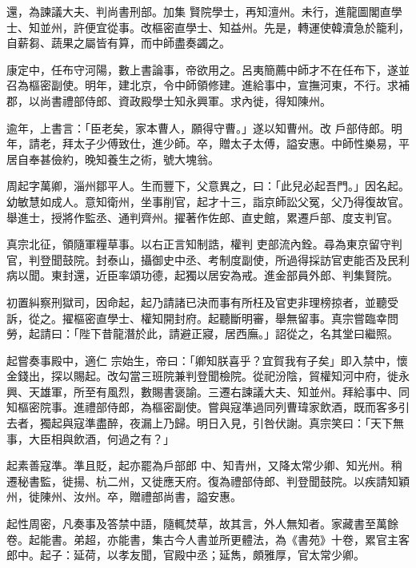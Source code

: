 \begin{pinyinscope}
 還，為諫議大夫、判尚書刑部。加集
 賢院學士，再知澶州。未行，進龍圖閣直學士、知並州，許便宜從事。改樞密直學士、知益州。先是，轉運使韓瀆急於籠利，自薪芻、蔬果之屬皆有算，而中師盡奏蠲之。



 康定中，任布守河陽，數上書論事，帝欲用之。呂夷簡薦中師才不在任布下，遂並召為樞密副使。明年，建北京，令中師領修建。進給事中，宣撫河東，不行。求補郡，以尚書禮部侍郎、資政殿學士知永興軍。求內徙，得知陳州。



 逾年，上書言：「臣老矣，家本曹人，願得守曹。」遂以知曹州。改
 戶部侍郎。明年，請老，拜太子少傅致仕，進少師。卒，贈太子太傅，謚安惠。中師性樂易，平居自奉甚儉約，晚知養生之術，號大塊翁。



 周起字萬卿，淄州鄒平人。生而豐下，父意異之，曰：「此兒必起吾門。」因名起。幼敏慧如成人。意知衛州，坐事削官，起才十三，詣京師訟父冤，父乃得復故官。舉進士，授將作監丞、通判齊州。擢著作佐郎、直史館，累遷戶部、度支判官。



 真宗北征，領隨軍糧草事。以右正言知制誥，權判
 吏部流內銓。尋為東京留守判官，判登聞鼓院。封泰山，攝御史中丞、考制度副使，所過得採訪官吏能否及民利病以聞。東封還，近臣率頌功德，起獨以居安為戒。進金部員外郎、判集賢院。



 初置糾察刑獄司，因命起，起乃請諸已決而事有所枉及官吏非理榜掠者，並聽受訴，從之。擢樞密直學士、權知開封府。起聽斷明審，舉無留事。真宗嘗臨幸問勞，起請曰：「陛下昔龍潛於此，請避正寢，居西廡。」詔從之，名其堂曰繼照。



 起嘗奏事殿中，適仁
 宗始生，帝曰：「卿知朕喜乎？宜賀我有子矣」即入禁中，懷金錢出，探以賜起。改勾當三班院兼判登聞檢院。從祀汾陰，貿權知河中府，徙永興、天雄軍，所至有風烈，數賜書褒諭。三遷右諫議大夫、知並州。拜給事中、同知樞密院事。進禮部侍郎，為樞密副使。嘗與寇準過同列曹瑋家飲酒，既而客多引去者，獨起與寇準盡醉，夜漏上乃歸。明日入見，引咎伏謝。真宗笑曰：「天下無事，大臣相與飲酒，何過之有？」



 起素善寇準。準且貶，起亦罷為戶部郎
 中、知青州，又降太常少卿、知光州。稍遷秘書監，徙揚、杭二州，又徙應天府。復為禮部侍郎、判登聞鼓院。以疾請知穎州，徙陳州、汝州。卒，贈禮部尚書，謚安惠。



 起性周密，凡奏事及答禁中語，隨輒焚草，故其言，外人無知者。家藏書至萬餘卷。起能書。弟超，亦能書，集古今人書並所更體法，為《書苑》十卷，累官主客郎中。起子：延荷，以孝友聞，官殿中丞；延雋，頗雅厚，官太常少卿。




\end{pinyinscope}
